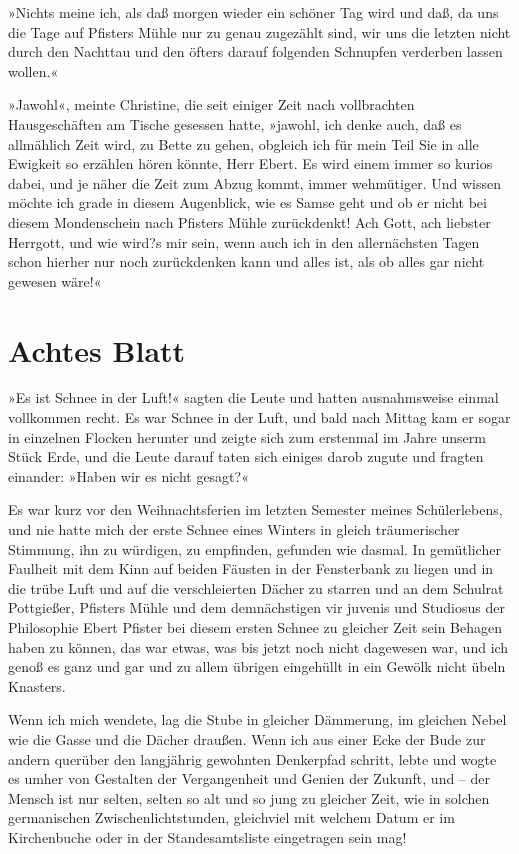 »Nichts meine ich, als daß morgen wieder ein schöner Tag wird und
daß, da uns die Tage auf Pfisters Mühle nur zu genau zugezählt
sind, wir uns die letzten nicht durch den Nachttau und den öfters
darauf folgenden Schnupfen verderben lassen wollen.«

»Jawohl«, meinte Christine, die seit einiger Zeit nach vollbrachten
Hausgeschäften am Tische gesessen hatte, »jawohl, ich denke auch,
daß es allmählich Zeit wird, zu Bette zu gehen, obgleich ich für
mein Teil Sie in alle Ewigkeit so erzählen hören könnte, Herr
Ebert. Es wird einem immer so kurios dabei, und je näher die Zeit
zum Abzug kommt, immer wehmütiger. Und wissen möchte ich grade in
diesem Augenblick, wie es Samse geht und ob er nicht bei diesem
Mondenschein nach Pfisters Mühle zurückdenkt! Ach Gott, ach
liebster Herrgott, und wie wird?s mir sein, wenn auch ich in den
allernächsten Tagen schon hierher nur noch zurückdenken kann und
alles ist, als ob alles gar nicht gewesen wäre!«

\section{Achtes Blatt}

»Es ist Schnee in der Luft!« sagten die Leute und hatten
ausnahmsweise einmal vollkommen recht. Es war Schnee in der Luft,
und bald nach Mittag kam er sogar in einzelnen Flocken herunter und
zeigte sich zum erstenmal im Jahre unserm Stück Erde, und die Leute
darauf taten sich einiges darob zugute und fragten einander: »Haben
wir es nicht gesagt?«

Es war kurz vor den Weihnachtsferien im letzten Semester meines
Schülerlebens, und nie hatte mich der erste Schnee eines Winters in
gleich träumerischer Stimmung, ihn zu würdigen, zu empfinden,
gefunden wie dasmal. In gemütlicher Faulheit mit dem Kinn auf
beiden Fäusten in der Fensterbank zu liegen und in die trübe Luft
und auf die verschleierten Dächer zu starren und an dem Schulrat
Pottgießer, Pfisters Mühle und dem demnächstigen vir juvenis und
Studiosus der Philosophie Ebert Pfister bei diesem ersten Schnee zu
gleicher Zeit sein Behagen haben zu können, das war etwas, was bis
jetzt noch nicht dagewesen war, und ich genoß es ganz und gar und
zu allem übrigen eingehüllt in ein Gewölk nicht übeln Knasters.

Wenn ich mich wendete, lag die Stube in gleicher Dämmerung, im
gleichen Nebel wie die Gasse und die Dächer draußen. Wenn ich aus
einer Ecke der Bude zur andern querüber den langjährig gewohnten
Denkerpfad schritt, lebte und wogte es umher von Gestalten der
Vergangenheit und Genien der Zukunft, und – der Mensch ist nur
selten, selten so alt und so jung zu gleicher Zeit, wie in solchen
germanischen Zwischenlichtstunden, gleichviel mit welchem Datum er
im Kirchenbuche oder in der Standesamtsliste eingetragen sein mag!

